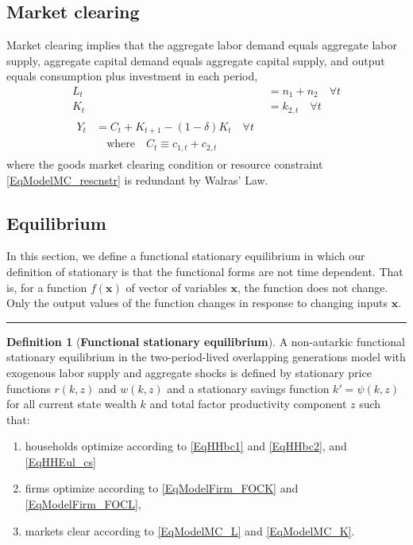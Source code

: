 \documentclass[letterpaper,12pt]{article}
\theoremstyle{definition}
\newtheorem{definition}{Definition} %
\begin{document}
\begin{spacing}{1.5}
  \subsection{Market clearing}\label{SecModelShutMktClr}

    Market clearing implies that the aggregate labor demand equals aggregate labor supply, aggregate capital demand equals aggregate capital supply, and output equals consumption plus investment in each period,
    \begin{align}
      L_t &= n_1 + n_2 \quad\forall t \label{EqModelMC_L} \\
      K_t &= k_{2,t} \quad\forall t \label{EqModelMC_K} \\
      \begin{split}
        Y_t &= C_t + K_{t+1} - (1-\delta)K_t \quad\forall t \\
        &\quad\text{where}\quad C_t\equiv c_{1,t} + c_{2,t}
      \end{split} \label{EqModelMC_rescnstr}
    \end{align}
    where the goods market clearing condition or resource constraint \eqref{EqModelMC_rescnstr} is redundant by Walras' Law.


  \subsection{Equilibrium}\label{SecModelEqlb}

    In this section, we define a functional stationary equilibrium in which our definition of stationary is that the functional forms are not time dependent. That is, for a function $f(\bm{x})$ of vector of variables $\bm{x}$, the function does not change. Only the output values of the function changes in response to changing inputs $\bm{x}$.

    \end{spacing}
    \vspace{5mm}
    \hrule
    \vspace{-1mm}
    \begin{definition}[\textbf{Functional stationary equilibrium}]\label{DefEqlb}
      A non-autarkic functional stationary equilibrium in the two-period-lived overlapping generations model with exogenous labor supply and aggregate shocks is defined by stationary price functions $r(k,z)$ and $w(k,z)$ and a stationary savings function $k'=\psi(k,z)$ for all current state wealth $k$ and total factor productivity component $z$ such that:
      \begin{enumerate}
        \item households optimize according to \eqref{EqHHbc1} and \eqref{EqHHbc2}, and \eqref{EqHHEul_cs}
        \item firms optimize according to \eqref{EqModelFirm_FOCK} and \eqref{EqModelFirm_FOCL},
        \item markets clear according to \eqref{EqModelMC_L} and \eqref{EqModelMC_K}.
      \end{enumerate}
    \end{definition}
\end{document}
